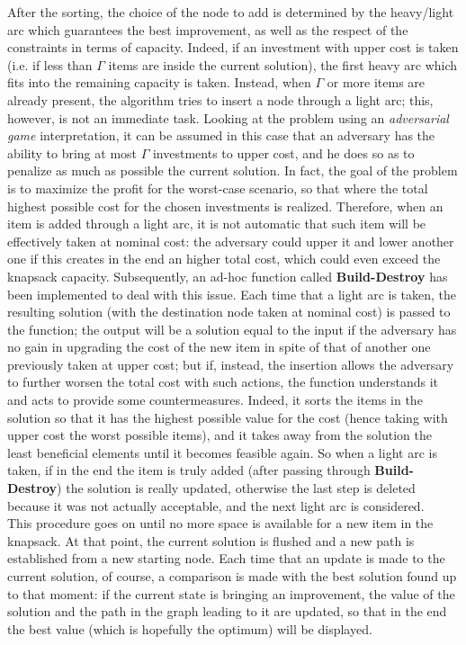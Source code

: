 \documentclass{article}
\begin{document}
After the sorting, the choice of the node to add is determined by the heavy/light arc which guarantees the best improvement, as well as the respect of the constraints in terms of capacity. Indeed, if an investment with upper cost is taken (i.e. if less than $\Gamma$ items are inside the current solution), the first heavy arc which fits into the remaining capacity is taken. Instead, when $\Gamma$ or more items are already present, the algorithm tries to insert a node through a light arc; this, however, is not an immediate task. Looking at the problem using an \textit{adversarial game} interpretation, it can be assumed in this case that an adversary has the ability to bring at most $\Gamma$ investments to upper cost, and he does so as to penalize as much as possible the current solution. In fact, the goal of the problem is to maximize the profit for the worst-case scenario, so that where the total highest possible cost for the chosen investments is realized. Therefore, when an item is added through a light arc, it is not automatic that such item will be effectively taken at nominal cost: the adversary could upper it and lower another one if this creates in the end an higher total cost, which could even exceed the knapsack capacity. Subsequently, an ad-hoc function called \textbf{Build-Destroy} has been implemented to deal with this issue. Each time that a light arc is taken, the resulting solution (with the destination node taken at nominal cost) is passed to the function; the output will be a solution equal to the input if the adversary has no gain in upgrading the cost of the new item in spite of that of another one previously taken at upper cost; but if, instead, the insertion allows the adversary to further worsen the total cost with such actions, the function understands it and acts to provide some countermeasures. Indeed, it sorts the items in the solution so that it has the highest possible value for the cost (hence taking with upper cost the worst possible items), and it takes away from the solution the least beneficial elements until it becomes feasible again. So when a light arc is taken, if in the end the item is truly added (after passing through \textbf{Build-Destroy}) the solution is really updated, otherwise the last step is deleted because it was not actually acceptable, and the next light arc is considered. \\

This procedure goes on until no more space is available for a new item in the knapsack. At that point, the current solution is flushed and a new path is established from a new starting node. Each time that an update is made to the current solution, of course, a comparison is made with the best solution found up to that moment: if the current state is bringing an improvement, the value of the solution and the path in the graph leading to it are updated, so that in the end the best value (which is hopefully the optimum) will be displayed.
\end{document}
